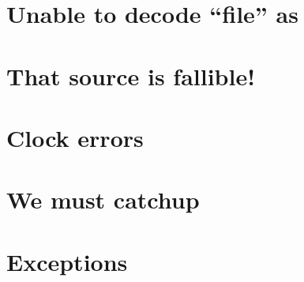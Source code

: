 \section{Unable to decode “file” as }

\section{That source is fallible!}

\section{Clock errors}

\section{We must catchup}

\section{Exceptions}